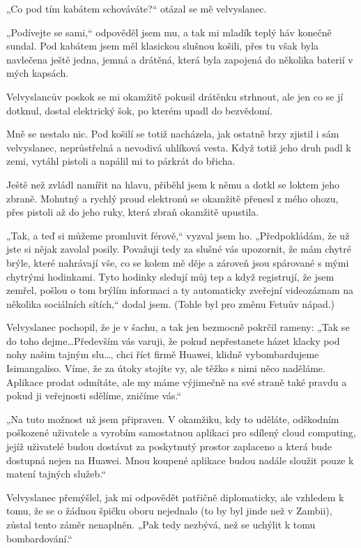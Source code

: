  „Co pod tím kabátem schováváte?“ otázal se mě velvyslanec.
 
„Podívejte se sami,“ odpověděl jsem mu, a tak mi mladík teplý háv konečně sundal.
Pod kabátem jsem měl klasickou slušnou košili, přes tu však byla navlečena ještě jedna, jemná a drátěná, která byla zapojená do několika baterií v mých kapsách. 

Velvyslancův poskok se mi okamžitě pokusil drátěnku strhnout, ale jen co se jí dotknul, dostal elektrický šok, po kterém upadl do bezvědomí.

 Mně se nestalo nic. Pod košilí se totiž nacházela, jak ostatně brzy zjistil i sám velvyslanec, neprůstřelná a nevodivá uhlíková vesta. Když totiž jeho druh padl k zemi, vytáhl pistoli a napálil mi to párkrát do břicha.
 
Ještě než zvládl namířit na hlavu, přiběhl jsem k němu a dotkl se loktem jeho zbraně. Mohutný a rychlý proud elektronů se okamžitě přenesl z mého ohozu, přes pistoli až do jeho ruky, která zbraň okamžitě upustila.

„Tak, a teď si můžeme promluvit férově,“ vyzval jsem ho. „Předpokládám, že už jste si nějak zavolal posily. Považuji tedy za slušné vás upozornit, že mám chytré brýle, které nahrávají vše, co se kolem mě děje a zároveň jsou spárované s mými chytrými hodinkami. Tyto hodinky sledují můj tep a když registrují, že jsem zemřel, pošlou o tom brýlím informaci a ty automaticky zveřejní videozáznam na několika sociálních sítích,“ dodal jsem. (Tohle byl pro změnu Fetuův nápad.)

Velvyslanec pochopil, že je v šachu, a tak jen bezmocně pokrčil rameny: „Tak se do toho dejme…Především vás varuji, že pokud nepřestanete házet klacky pod nohy našim tajným slu…, chci říct firmě Huawei, klidně vybombardujeme Isimangaliso. Víme, že za útoky stojíte vy, ale těžko s nimi něco naděláme. Aplikace prodat odmítáte, ale my máme výjimečně na své straně také pravdu a pokud ji veřejnosti sdělíme, zničíme vás.“

„Na tuto možnost už jsem připraven. V okamžiku, kdy to uděláte, odškodním poškozené uživatele a vyrobím samostatnou aplikaci pro sdílený cloud computing, jejíž uživatelé budou dostávat za poskytnutý prostor zaplaceno a která bude dostupná nejen na Huawei. Mnou koupené aplikace budou nadále sloužit pouze k matení tajných služeb.“

Velvyslanec přemýšlel, jak mi odpovědět patřičně diplomaticky, ale vzhledem k tomu, že se o žádnou špičku oboru nejednalo (to by byl jinde než v Zambii), zůstal tento záměr nenaplněn. „Pak tedy nezbývá, než se uchýlit k tomu bombardování.“

